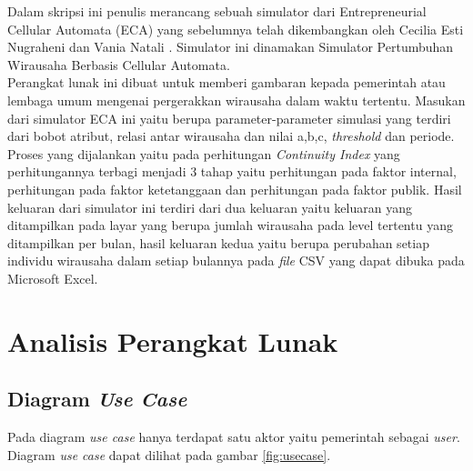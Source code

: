 Dalam skripsi ini penulis merancang sebuah simulator dari Entrepreneurial Cellular Automata (ECA) yang sebelumnya telah dikembangkan oleh Cecilia Esti Nugraheni dan Vania Natali \cite{ECA}. Simulator ini dinamakan Simulator Pertumbuhan Wirausaha Berbasis Cellular Automata.\\
Perangkat lunak ini dibuat untuk memberi gambaran kepada pemerintah atau lembaga umum mengenai pergerakkan wirausaha dalam waktu tertentu. Masukan dari simulator ECA ini yaitu berupa parameter-parameter simulasi yang terdiri dari bobot atribut, relasi antar wirausaha dan nilai a,b,c, \textit{threshold} dan periode. Proses yang dijalankan yaitu pada perhitungan \textit{Continuity Index} yang perhitungannya terbagi menjadi 3 tahap yaitu perhitungan pada faktor internal, perhitungan pada faktor ketetanggaan dan perhitungan pada faktor publik. Hasil keluaran dari simulator ini terdiri dari dua keluaran yaitu keluaran yang ditampilkan pada layar yang berupa jumlah wirausaha pada level tertentu yang ditampilkan per bulan, hasil keluaran kedua yaitu berupa perubahan setiap individu wirausaha dalam setiap bulannya pada \textit{file} CSV yang dapat dibuka pada Microsoft Excel.


\section{Analisis Perangkat Lunak}
\label{analisisPL}

\subsection{Diagram \textit{Use Case}}

Pada diagram \textit{use case} hanya terdapat satu aktor yaitu pemerintah sebagai \textit{user}. Diagram \textit{use case} dapat dilihat pada gambar \ref{fig:usecase}.

